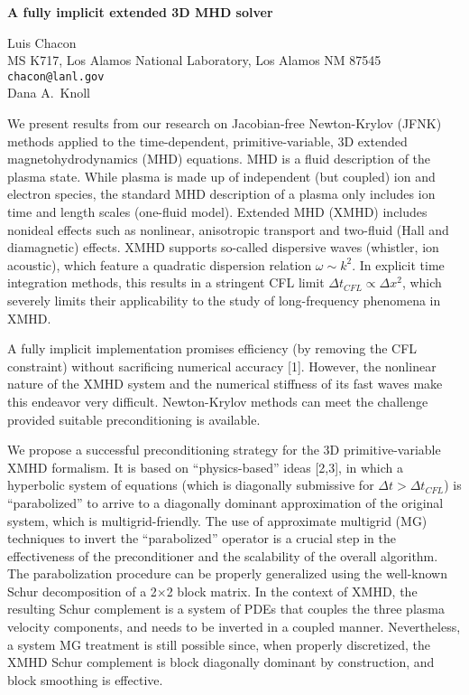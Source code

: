 \documentclass{report}
\begin{document}

\begin{center}
{\large
{\bf A fully implicit extended 3D MHD solver}}

	Luis Chacon \\
	MS K717, Los Alamos National Laboratory, Los Alamos NM 87545 \\
	{\tt chacon@lanl.gov} \\
	Dana A.~Knoll
\end{center}
We present results from our research on Jacobian-free
Newton-Krylov (JFNK) methods applied to the time-dependent,
primitive-variable, 3D extended magnetohydrodynamics (MHD)
equations. MHD is a fluid description of the plasma state.
While plasma is made up of independent (but coupled) ion and
electron species, the standard MHD description of a plasma
only includes ion time and length scales (one-fluid model).
Extended MHD (XMHD) includes nonideal effects such as
nonlinear, anisotropic transport and two-fluid (Hall and
diamagnetic) effects. XMHD supports so-called dispersive
waves (whistler, ion acoustic), which feature a quadratic
dispersion relation $\omega \sim k^{2}$. In explicit time
integration methods, this results in a stringent CFL limit
$\Delta t_{CFL}\propto \Delta x^{2}$, which severely limits
their applicability to the study of long-frequency phenomena
in XMHD.

A fully implicit implementation promises
efficiency (by removing the CFL constraint) without
sacrificing numerical accuracy [1].
However, the nonlinear
nature of the XMHD system and the numerical stiffness of its
fast waves make this endeavor very difficult. Newton-Krylov
methods can meet the challenge provided suitable
preconditioning is available.

We propose a successful
preconditioning strategy for the 3D primitive-variable XMHD
formalism. It is based on ``physics-based'' ideas [2,3],
in which a hyperbolic system of
equations (which is diagonally submissive for $\Delta
t>\Delta t_{CFL}$) is {}``parabolized'' to arrive to a
diagonally dominant approximation of the original system,
which is multigrid-friendly. The use of approximate
multigrid (MG) techniques to invert the {}``parabolized''
operator is a crucial step in the effectiveness of the
preconditioner and the scalability of the overall algorithm.
The parabolization procedure can be properly generalized
using the well-known Schur decomposition of a 2$\times $2
block matrix. In the context of XMHD, the resulting Schur
complement is a system of PDEs that couples the three
plasma velocity components, and needs to be inverted in a
coupled manner. Nevertheless, a system MG treatment is still
possible since, when properly discretized, the XMHD Schur
complement is block diagonally dominant by construction, and
block smoothing is effective.
\end{document}

